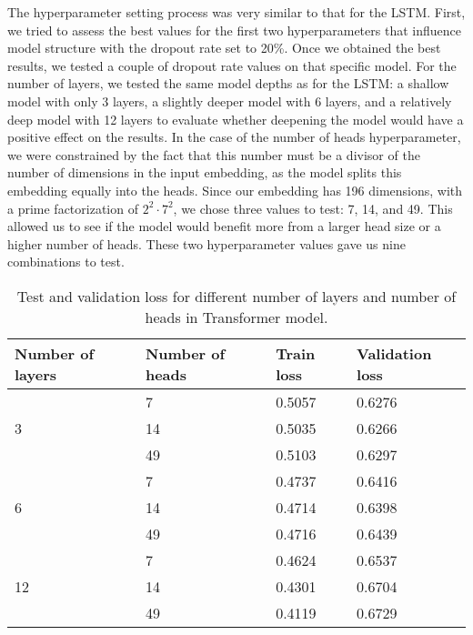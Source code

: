 The hyperparameter setting process was very similar to that for the LSTM. First, we tried to assess the best values for the first two hyperparameters that influence model structure with the dropout rate set to 20\%. Once we obtained the best results, we tested a couple of dropout rate values on that specific model. For the number of layers, we tested the same model depths as for the LSTM: a shallow model with only 3 layers, a slightly deeper model with 6 layers, and a relatively deep model with 12 layers to evaluate whether deepening the model would have a positive effect on the results. In the case of the number of heads hyperparameter, we were constrained by the fact that this number must be a divisor of the number of dimensions in the input embedding, as the model splits this embedding equally into the heads. Since our embedding has 196 dimensions, with a prime factorization of $2^2\cdot7^2$, we chose three values to test: 7, 14, and 49. This allowed us to see if the model would benefit more from a larger head size or a higher number of heads. These two hyperparameter values gave us nine combinations to test.
\\

\begin{table}[!h]
	\centering
	\begin{tabular}{|l|l|l|l|}
		\hline
		Number of layers    & Number of heads & Train loss & Validation loss \\ \hline
		\multirow{3}{*}{3}  & 7        &  0.5057         &  0.6276               \\ \cline{2-4} 
		& 14              &  0.5035         &  0.6266               \\ \cline{2-4} 
		& 49              &  0.5103         &  0.6297               \\ \hline
		\multirow{3}{*}{6}  & 7       & 0.4737          &  0.6416               \\ \cline{2-4} 
		& 14              &  0.4714         &  0.6398               \\ \cline{2-4} 
		& 49              &  0.4716         &  0.6439               \\ \hline
		\multirow{3}{*}{12} & 7       & 0.4624          & 0.6537                \\ \cline{2-4} 
		& 14              & 0.4301          &  0.6704               \\ \cline{2-4} 
		& 49              & 0.4119          &  0.6729               \\ \hline
	\end{tabular}
	\caption{Test and validation loss for different number of layers and number of heads in Transformer model.}
	\label{tab:transformer_train}
\end{table}

